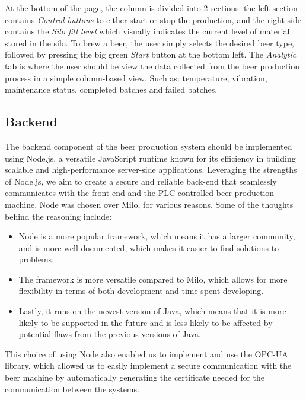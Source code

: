 At the bottom of the page, the column is divided into 2 sections: the left section contains \textit{Control buttons} to either start or stop the production, and the right side contains the \textit{Silo fill level} which visually indicates the current level of material stored in the silo. \newline
To brew a beer, the user simply selects the desired beer type, followed by pressing the big green \textit{Start} button at the bottom left.
The \textit{Analytic} tab is where the user should be view the data collected from the beer production process in a simple column-based view. Such as: temperature, vibration, maintenance status, completed batches and failed batches. \newline

\subsection{Backend}
The backend component of the beer production system should be implemented using Node.js, a versatile JavaScript runtime known for its efficiency in building scalable and high-performance server-side applications. Leveraging the strengths of Node.js, we aim to create a secure and reliable back-end that seamlessly communicates with the front end and the PLC-controlled beer production machine.
Node was chosen over Milo, for various reasons. Some of the thoughts behind the reasoning include:
\begin{itemize}
  \item Node is a more popular framework, which means it has a larger community, and is more well-documented, which makes it easier to find solutions to problems.  
  \item The framework is more versatile compared to Milo, which allows for more flexibility in terms of both development and time spent developing. 
  \item Lastly, it runs on the newest version of Java, which means that it is more likely to be supported in the future and is less likely to be affected by potential flaws from the previous versions of Java. \newline
\end{itemize}
This choice of using Node also enabled us to implement and use the OPC-UA library, which allowed us to easily implement a secure communication with the beer machine by automatically generating the certificate needed for the communication between the systems.

